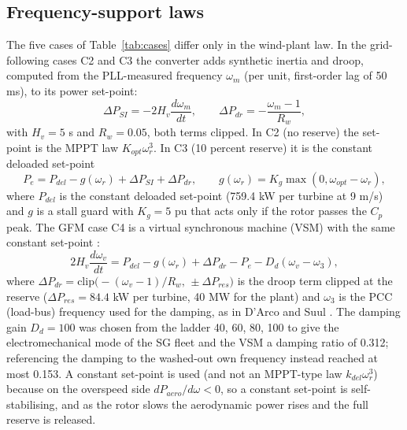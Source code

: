 \documentclass[11pt,a4paper]{article}
\begin{document}
\subsection{Frequency-support laws}
The five cases of Table~\ref{tab:cases} differ only in the wind-plant law. In the grid-following cases C2 and C3 the converter adds synthetic inertia and droop, computed from the PLL-measured frequency $\omega_m$ (per unit, first-order lag of 50 ms), to its power set-point:
\begin{equation}\Delta P_{SI}=-2H_v\frac{d\omega_m}{dt},\qquad \Delta P_{dr}=-\frac{\omega_m-1}{R_w},\end{equation}
with $H_v=5$ s and $R_w=0.05$, both terms clipped. In C2 (no reserve) the set-point is the MPPT law $K_{opt}\omega_r^3$. In C3 (10 percent reserve) it is the constant deloaded set-point
\begin{equation}P_e=P_{del}-g(\omega_r)+\Delta P_{SI}+\Delta P_{dr},\qquad g(\omega_r)=K_g\max(0,\omega_{opt}-\omega_r),\end{equation}
where $P_{del}$ is the constant deloaded set-point (759.4 kW per turbine at 9 m/s) and $g$ is a stall guard with $K_g=5$ pu that acts only if the rotor passes the $C_p$ peak. The GFM case C4 is a virtual synchronous machine (VSM) with the same constant set-point \cite{lyu,darco}:
\begin{equation}\label{eq:gfm}
2H_v\frac{d\omega_v}{dt}=P_{del}-g(\omega_r)+\Delta P_{dr}-P_e-D_d(\omega_v-\omega_3),
\end{equation}
where $\Delta P_{dr}=\mathrm{clip}\big(-(\omega_v-1)/R_w,\,\pm\Delta P_{res}\big)$ is the droop term clipped at the reserve ($\Delta P_{res}=84.4$ kW per turbine, 40 MW for the plant) and $\omega_3$ is the PCC (load-bus) frequency used for the damping, as in D'Arco and Suul \cite{darco}. The damping gain $D_d=100$ was chosen from the ladder 40, 60, 80, 100 to give the electromechanical mode of the SG fleet and the VSM a damping ratio of 0.312; referencing the damping to the washed-out own frequency instead reached at most 0.153. A constant set-point is used (and not an MPPT-type law $k_{del}\omega_r^3$) because on the overspeed side $dP_{aero}/d\omega<0$, so a constant set-point is self-stabilising, and as the rotor slows the aerodynamic power rises and the full reserve is released.
\end{document}
